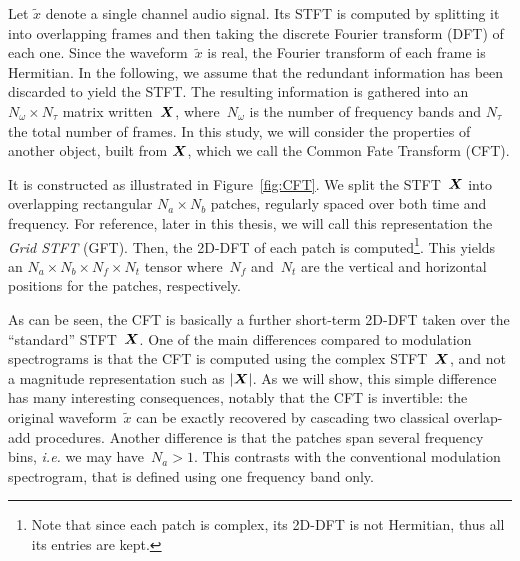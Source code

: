 Let $\tilde{x}$ denote a single channel audio signal.
Its \ac{STFT} is computed by splitting it into overlapping frames and then taking the discrete Fourier transform (DFT) of each one.
Since the waveform~$\tilde{x}$ is real, the Fourier transform of each frame is Hermitian. In the following, we assume that the redundant information has been discarded to yield the \acs{STFT}.
The resulting information is gathered into an $N_{\omega}\times N_{\tau}$ matrix written~${\bm{X}}$, where~$N_{\omega}$ is the number of frequency bands and $N_{\tau}$ the total number of frames.
In this study, we will consider the properties of another object, built from ${\bm{X}}$, which we call the Common Fate Transform (CFT).
\par
It is constructed as illustrated in Figure~\ref{fig:CFT}.
We split the \acs{STFT}~${\bm{X}}$ into overlapping rectangular $N_{a}\times N_{b}$ patches, regularly spaced over both time and frequency.
For reference, later in this thesis, we will call this representation the \emph{Grid STFT} (GFT).
Then, the 2D-DFT of each patch is computed\footnote{Note that since each patch is complex, its 2D-DFT is not Hermitian, thus all its entries are kept.}.
This yields an $N_{a}\times N_{b}\times N_{f}\times N_{t}$ tensor where~$N_{f}$ and~$N_{t}$ are the vertical and horizontal positions for the patches, respectively.
\par
As can be seen, the CFT is basically a further short-term 2D-DFT taken over the ``standard'' \acs{STFT}~${\bm{X}}$.
One of the main differences compared to modulation spectrograms is that the CFT is computed using the complex \acs{STFT}~${\bm{X}}$, and not a magnitude representation such as $\left|{\bm{X}}\right|$.
As we will show, this simple difference has many interesting consequences, notably that the CFT is invertible: the original waveform~$\tilde{x}$ can be exactly recovered by cascading two classical overlap-add procedures.
Another difference is that the patches span several frequency bins, \emph{i.e.} we may have~$N_{a}>1$.
This contrasts with the conventional modulation spectrogram, that is defined using one frequency band only.

